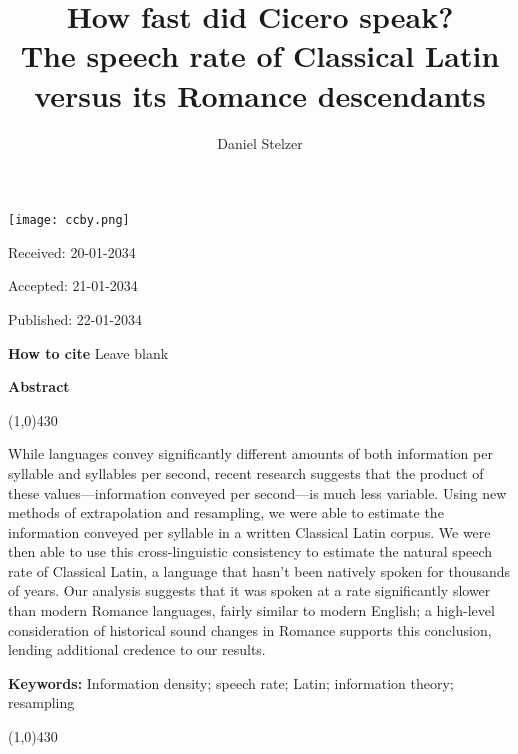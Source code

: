 \documentclass[12pt,twoside]{article}
\title{{\Huge{}How fast did Cicero speak?}\\{\Large{}The speech rate of Classical Latin versus its Romance descendants}}
\author{Daniel Stelzer}
\affil{University of Illinois at Urbana-Champaign\\stelzer3@illinois.edu}
\date{}
\makeatletter
\def\maketitle{{%
		\renewenvironment{tabular}[2][]
		{\begin{flushleft}}
			{\end{flushleft}}
		\AB@maketitle}}
\makeatother
\begin{document}
\maketitle

\thispagestyle{first}

\vspace{0.5cm}
\noindent \texttt{[image: ccby.png]}

\hfill Received: 20-01-2034 

\hfill Accepted: 21-01-2034

\hfill Published: 22-01-2034

\vspace{1cm}

\noindent \textbf{How to cite} Leave blank

\vspace{1.5cm}

\noindent \textbf{Abstract}
\begin{center}
 	\line(1,0){430}
\end{center}
\vspace{-0,3cm}
\noindent While languages convey significantly different amounts of both information per syllable and syllables per second, recent research suggests that the product of these values---information conveyed per second---is much less variable. Using new methods of extrapolation and resampling, we were able to estimate the information conveyed per syllable in a written Classical Latin corpus. We were then able to use this cross-linguistic consistency to estimate the natural speech rate of Classical Latin, a language that hasn't been natively spoken for thousands of years. Our analysis suggests that it was spoken at a rate significantly slower than modern Romance languages, fairly similar to modern English; a high-level consideration of historical sound changes in Romance supports this conclusion, lending additional credence to our results.

\vspace{5mm}

\noindent \textbf{Keywords:} Information density; speech rate; Latin; information theory; resampling

\vspace{4mm}
\begin{center}
	\line(1,0){430}
\end{center}

\end{document}
